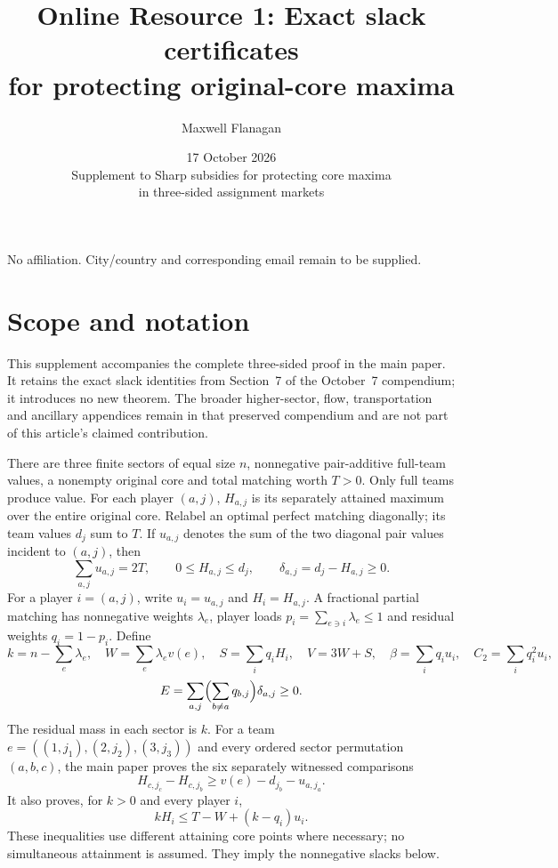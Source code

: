 \documentclass[11pt]{article}
\title{Online Resource 1: Exact slack certificates\\for protecting original-core maxima}
\author{Maxwell Flanagan}
\date{17 October 2026\\[2pt]\small Supplement to Sharp subsidies for protecting core maxima\\in three-sided assignment markets}
\theoremstyle{remark}
\begin{document}
\maketitle
\noindent No affiliation. City/country and corresponding email remain to be supplied.

\section{Scope and notation}
This supplement accompanies the complete three-sided proof in the main paper.
It retains the exact slack identities from Section~7 of the October~7
compendium; it introduces no new theorem. The broader higher-sector, flow,
transportation and ancillary appendices remain in that preserved compendium
and are not part of this article's claimed contribution.

There are three finite sectors of equal size $n$, nonnegative pair-additive full-team
values, a nonempty original core and total matching worth $T>0$. Only full
teams produce value. For each player $(a,j)$, $H_{a,j}$ is its separately
attained maximum over the entire original core. Relabel an optimal perfect
matching diagonally; its team values $d_j$ sum to $T$. If $u_{a,j}$ denotes
the sum of the two diagonal pair values incident to $(a,j)$, then
\[
\sum_{a,j}u_{a,j}=2T,\qquad 0\le H_{a,j}\le d_j,
\qquad\delta_{a,j}=d_j-H_{a,j}\ge0.
\]
For a player $i=(a,j)$, write $u_i=u_{a,j}$ and $H_i=H_{a,j}$.
A fractional partial matching has nonnegative weights $\lambda_e$, player
loads $p_i=\sum_{e\ni i}\lambda_e\le1$ and residual weights $q_i=1-p_i$.
Define
\[
 k=n-\sum_e\lambda_e,\quad W=\sum_e\lambda_ev(e),\quad
 S=\sum_iq_iH_i,\quad V=3W+S,\quad
 \beta=\sum_iq_iu_i,\quad C_2=\sum_iq_i^2u_i,
\]
\[
 E=\sum_{a,j}\Bigl(\sum_{b\ne a}q_{b,j}\Bigr)\delta_{a,j}\ge0.
\]
The residual mass in each sector is $k$. For a team
$e=((1,j_1),(2,j_2),(3,j_3))$ and every ordered sector permutation $(a,b,c)$,
the main paper proves the six separately witnessed comparisons
\begin{equation}\label{eq:comparison}
 H_{c,j_c}-H_{c,j_b}\ge v(e)-d_{j_b}-u_{a,j_a}.
\end{equation}
It also proves, for $k>0$ and every player $i$,
\[
 kH_i\le T-W+(k-q_i)u_i.
\]
These inequalities use different attaining core points where necessary;
no simultaneous attainment is assumed. They imply the nonnegative slacks below.
\end{document}
